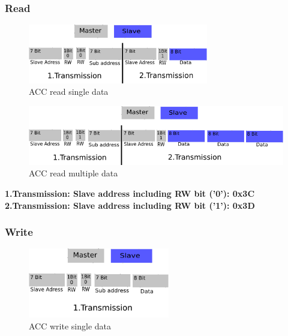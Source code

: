\subsubsection{Read}
\label{subsubsec:ACCread}

\begin{figure}[H]
	\centering\includegraphics[width=0.7\textwidth]{fig/ACC_read_single}
	\caption{ACC read single data}
	\label{fig:ACC1}
\end{figure}

\begin{figure}[H]
	\centering\includegraphics[width=1\textwidth]{fig/ACC_read_multiple}
	\caption{ACC read multiple data}
	\label{fig:ACC2}
\end{figure}

\textbf{1.Transmission: Slave address including RW bit ('0'): 0x3C}\\
\textbf{2.Transmission: Slave address including RW bit ('1'): 0x3D}


\subsubsection{Write}
\label{subsubsec:ACCwrite}

\begin{figure}[H]
	\centering\includegraphics[width=0.55\textwidth]{fig/ACC_write_single}
	\caption{ACC write single data}
	\label{fig:ACC3}
\end{figure}

